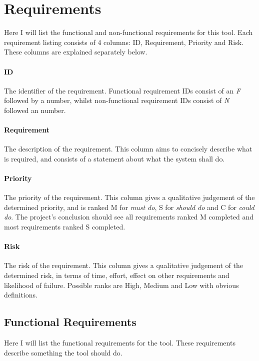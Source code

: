 \section{Requirements}

Here I will list the functional and non-functional requirements for this tool.
Each requirement listing consists of 4 columns: ID, Requirement, Priority and Risk.
These columns are explained separately below.

\paragraph{ID}
The identifier of the requirement.
Functional requirement IDs consist of an \emph{F} followed by a number, whilst non-functional requirement IDs consist of \emph{N} followed an number.

\paragraph{Requirement}
The description of the requirement.
This column aims to concisely describe what is required, and consists of a statement about what the system shall do.

\paragraph{Priority}
The priority of the requirement.
This column gives a qualitative judgement of the determined priority, and is ranked M for \emph{must do}, S for \emph{should do} and C for \emph{could do}.
The project's conclusion should see all requirements ranked M completed and most requirements ranked S completed.

\paragraph{Risk}
The risk of the requirement.
This column gives a qualitative judgement of the determined risk, in terms of time, effort, effect on other requirements and likelihood of failure.
Possible ranks are High, Medium and Low with obvious definitions.

\subsection{Functional Requirements}

Here I will list the functional requirements for the tool.
These requirements describe something the tool should do.

